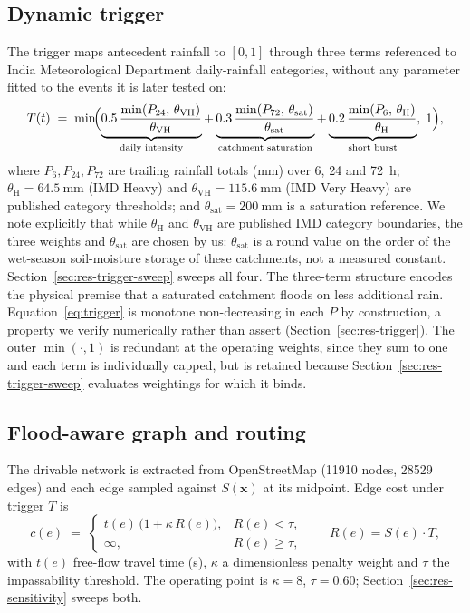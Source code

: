 \documentclass[11pt,a4paper]{article}
\newcommand{\Sx}{S(\mathbf{x})}
\newcommand{\Tt}{T(t)}
\begin{document}
\subsection{Dynamic trigger}
\label{sec:method-trigger}
The trigger maps antecedent rainfall to $[0,1]$ through three terms referenced to
India Meteorological Department daily-rainfall categories, without any parameter
fitted to the events it is later tested on:
\begin{equation}
\Tt \;=\; \min\!\Bigl(
\underbrace{0.5\,\frac{\min(P_{24},\,\theta_{\mathrm{VH}})}{\theta_{\mathrm{VH}}}}_{\text{daily intensity}}
+\underbrace{0.3\,\frac{\min(P_{72},\,\theta_{\mathrm{sat}})}{\theta_{\mathrm{sat}}}}_{\text{catchment saturation}}
+\underbrace{0.2\,\frac{\min(P_{6},\,\theta_{\mathrm{H}})}{\theta_{\mathrm{H}}}}_{\text{short burst}},
\;1\Bigr),
\label{eq:trigger}
\end{equation}
where $P_{6},P_{24},P_{72}$ are trailing rainfall totals (\si{\milli\metre}) over
6, 24 and \SI{72}{\hour}; $\theta_{\mathrm{H}}=\SI{64.5}{\milli\metre}$ (IMD
Heavy) and $\theta_{\mathrm{VH}}=\SI{115.6}{\milli\metre}$ (IMD Very Heavy) are
published category thresholds; and $\theta_{\mathrm{sat}}=\SI{200}{\milli\metre}$
is a saturation reference. We note explicitly that while $\theta_{\mathrm{H}}$
and $\theta_{\mathrm{VH}}$ are published IMD category boundaries, the three
weights and $\theta_{\mathrm{sat}}$ are chosen by us: $\theta_{\mathrm{sat}}$ is
a round value on the order of the wet-season soil-moisture storage of these
catchments, not a measured constant. Section~\ref{sec:res-trigger-sweep} sweeps
all four. The three-term structure encodes the physical premise
that a saturated catchment floods on less additional rain. Equation~\eqref{eq:trigger}
is monotone non-decreasing in each $P$ by construction, a property we verify
numerically rather than assert (Section~\ref{sec:res-trigger}). The outer
$\min(\cdot,1)$ is redundant at the operating weights, since they sum to one and
each term is individually capped, but is retained because
Section~\ref{sec:res-trigger-sweep} evaluates weightings for which it binds.

\subsection{Flood-aware graph and routing}
\label{sec:method-routing}
The drivable network is extracted from OpenStreetMap (\num{11910} nodes,
\num{28529} edges) and each edge sampled against $\Sx$ at its midpoint. Edge cost
under trigger $T$ is
\begin{equation}
c(e) \;=\;
\begin{cases}
t(e)\,\bigl(1+\kappa\,R(e)\bigr), & R(e) < \tau,\\[2pt]
\infty, & R(e) \ge \tau,
\end{cases}
\qquad R(e) = S(e)\cdot T,
\label{eq:edgecost}
\end{equation}
with $t(e)$ free-flow travel time (\si{\second}), $\kappa$ a dimensionless
penalty weight and $\tau$ the impassability threshold. The operating point is
$\kappa=8$, $\tau=0.60$; Section~\ref{sec:res-sensitivity} sweeps both.
\end{document}
